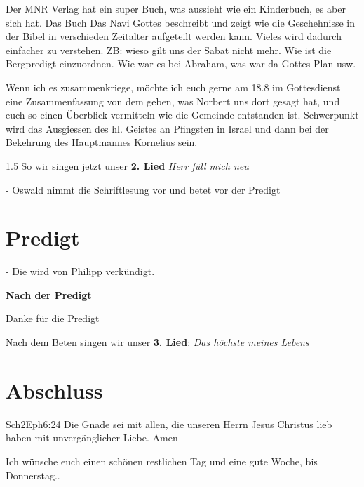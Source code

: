 \documentclass[12pt,a4paper]{scrarticle}
\begin{document}
\begin{spacing}{1.5}
Der MNR Verlag hat ein super Buch, was aussieht wie ein Kinderbuch, es aber sich hat. Das Buch \glqq Das Navi Gottes \grqq{} beschreibt und zeigt wie die  Geschehnisse in der Bibel in verschieden Zeitalter aufgeteilt werden kann. Vieles wird dadurch einfacher zu verstehen. ZB: wieso gilt uns der Sabat nicht mehr. Wie ist die Bergpredigt einzuordnen. Wie war es bei Abraham, was war da Gottes Plan usw.

Wenn ich es zusammenkriege, möchte ich euch gerne am 18.8 im Gottesdienst eine Zusammenfassung von dem geben, was Norbert uns dort gesagt hat, und euch so einen Überblick vermitteln wie die Gemeinde entstanden ist. Schwerpunkt wird das Ausgiessen des hl. Geistes an Pfingsten in Israel und dann bei der Bekehrung des Hauptmannes Kornelius sein.


\end{spacing}{1.5}
So wir singen jetzt unser \textbf{2. Lied} \textit{Herr füll mich neu}

- Oswald nimmt die Schriftlesung vor und betet vor der Predigt

\section{Predigt}
- Die wird von Philipp verkündigt.

\textbf{Nach der Predigt}

Danke für die Predigt

Nach dem Beten singen wir unser \textbf{3. Lied}: \textit{Das höchste meines Lebens}\\

\section{Abschluss}

\begin{bibeltext}{Sch2}{Eph}{6:24}
Die Gnade sei mit allen, die unseren Herrn Jesus Christus lieb haben mit unvergänglicher Liebe. Amen
\end{bibeltext}

Ich wünsche euch einen schönen restlichen Tag und eine gute Woche, bis Donnerstag..
\end{document}
